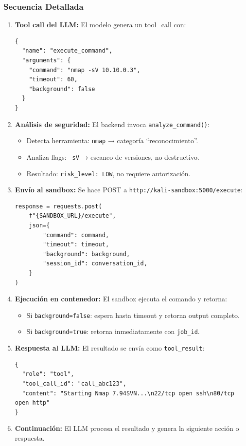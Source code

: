 \subsubsection{Secuencia Detallada}

\begin{enumerate}
    \item \textbf{Tool call del LLM:} El modelo genera un tool\_call con:
    \begin{verbatim}
{
  "name": "execute_command",
  "arguments": {
    "command": "nmap -sV 10.10.0.3",
    "timeout": 60,
    "background": false
  }
}
    \end{verbatim}
    
    \item \textbf{Análisis de seguridad:} El backend invoca \texttt{analyze\_command()}:
    \begin{itemize}
        \item Detecta herramienta: \texttt{nmap} → categoría ``reconocimiento''.
        \item Analiza flags: \texttt{-sV} → escaneo de versiones, no destructivo.
        \item Resultado: \texttt{risk\_level: LOW}, no requiere autorización.
    \end{itemize}
    
    \item \textbf{Envío al sandbox:} Se hace POST a \texttt{http://kali-sandbox:5000/execute}:
    \begin{verbatim}
response = requests.post(
    f"{SANDBOX_URL}/execute",
    json={
        "command": command,
        "timeout": timeout,
        "background": background,
        "session_id": conversation_id,
    }
)
    \end{verbatim}
    
    \item \textbf{Ejecución en contenedor:} El sandbox ejecuta el comando y retorna:
    \begin{itemize}
        \item Si \texttt{background=false}: espera hasta timeout y retorna output completo.
        \item Si \texttt{background=true}: retorna inmediatamente con \texttt{job\_id}.
    \end{itemize}
    
    \item \textbf{Respuesta al LLM:} El resultado se envía como \texttt{tool\_result}:
    \begin{verbatim}
{
  "role": "tool",
  "tool_call_id": "call_abc123",
  "content": "Starting Nmap 7.94SVN...\n22/tcp open ssh\n80/tcp open http"
}
    \end{verbatim}
    
    \item \textbf{Continuación:} El LLM procesa el resultado y genera la siguiente acción o respuesta.
\end{enumerate}

